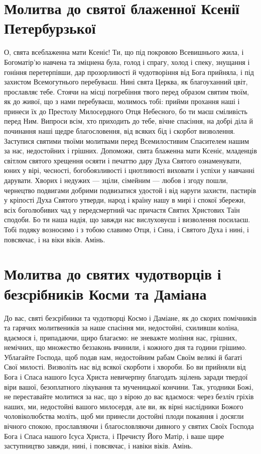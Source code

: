 \documentclass[chapters.tex]{subfiles}
\begin{document}
\section{Молитва до святої блаженної Ксенії Петербурзької}
О, свята всеблаженна мати Ксеніє! Ти, що під покровою Всевишнього жила, і Богоматір’ю навчена та зміцнена була, голод і спрагу, холод і спеку, знущання і гоніння перетерпівши, дар прозорливості й чудотворіння від Бога прийняла, і під захистом Всемогутнього перебуваєш. Нині свята Церква, як благоуханний цвіт, прославляє тебе. Стоячи на місці погребіння твого перед образом святим твоїм, як до живої, що з нами перебуваєш, молимось тобі: прийми прохання наші і принеси їх до Престолу Милосердного Отця Небесного, бо ти маєш сміливість перед Ним. Випроси всім, хто приходить до тебе, вічне спасіння, на добрі діла й починання наші щедре благословення, від всяких бід і скорбот визволення. Заступися святими твоїми молитвами перед Всемилостивим Спасителем нашим за нас, недостойних і грішних. Допоможи, свята блаженна мати Ксеніє, младенців світлом святого хрещення осяяти і печаттю дару Духа Святого ознаменувати, юних у вірі, чесності, богобоязливості і цнотливості виховати і успіхи у навчанні дарувати. Хворих і недужих — зціли, сімейним — любов і згоду пошли, чернецтво подвигами добрими подвизатися удостой і від наруги захисти, пастирів у кріпості Духа Святого утверди, народ і країну нашу в мирі і спокої збережи, всіх боголюбивих чад у передсмертний час причастя Святих Христових Таїн сподоби. Бо ти наша надія, що завжди нас вислуховуєш і визволення посилаєш. Тобі подяку возносимо і з тобою славимо Отця, і Сина, і Святого Духа і нині, і повсякчас, і на віки віків. Амінь.

\section{Молитва до святих чудотворців і безсрібників Косми та Даміана}
До вас, святі безсрібники та чудотворці Космо і Даміане, як до скорих помічників та гарячих молитвеників за наше спасіння ми, недостойні, схиливши коліна, вдаємося і, припадаючи, щиро благаємо: не зневажте моління нас, грішних, немічних, що множество беззаконь вчинили, і кожного дня та години грішимо. Ублагайте Господа, щоб подав нам, недостойним рабам Своїм великі й багаті Свої милості. Визволіть нас від всякої скорботи і хвороби. Бо ви прийняли від Бога і Спаса нашого Ісуса Христа невичерпну благодать зцілень заради твердої віри вашої, безоплатного лікування та мученицької кончини. Так, угодники Божі, не переставайте молитися за нас, що з вірою до вас вдаємося: через безліч гріхів наших, ми, недостойні вашого милосердя, але ви, як вірні наслідники Божого чоловіколюбства моліть, щоб ми принесли достойні плоди покаяння і досягли вічного спокою, прославляючи і благословляючи дивного у святих Своїх Господа Бога і Спаса нашого Ісуса Христа, і Пречисту Його Матір, і ваше щире заступництво завжди, нині, і повсякчас, і навіки віків. Амінь.
\end{document}
